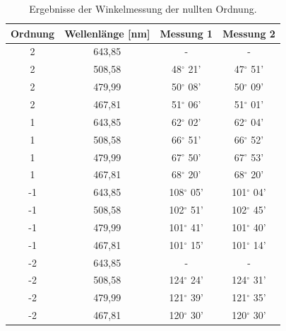 \documentclass[12pt,a4paper]{article}
\begin{document}
	\begin{table}
		\begin{center}
			\begin{tabular}{|c|c|c|c|}
				\hline
				Ordnung & Wellenlänge [nm] & Messung 1 & Messung 2\\
				\hline
				2 & 643,85 & - & -\\
				\hline
				2 & 508,58 & 48$^{\circ}$ 21' & 47$^{\circ}$ 51'\\
				\hline
				2 & 479,99 & 50$^{\circ}$ 08' & 50$^{\circ}$ 09'\\
				\hline
				2 & 467,81 & 51$^{\circ}$ 06' & 51$^{\circ}$ 01'\\
				\hline
				1 & 643,85 & 62$^{\circ}$ 02' & 62$^{\circ}$ 04'\\
				\hline
				1 & 508,58 & 66$^{\circ}$ 51' & 66$^{\circ}$ 52'\\
				\hline
				1 & 479,99 & 67$^{\circ}$ 50' & 67$^{\circ}$ 53'\\
				\hline
				1 & 467,81 & 68$^{\circ}$ 20' & 68$^{\circ}$ 20'\\
				\hline
				-1 & 643,85 & 108$^{\circ}$ 05' & 101$^{\circ}$ 04'\\
				\hline
				-1 & 508,58 & 102$^{\circ}$ 51' & 102$^{\circ}$ 45'\\
				\hline
				-1 & 479,99 & 101$^{\circ}$ 41' & 101$^{\circ}$ 40'\\
				\hline
				-1 & 467,81 & 101$^{\circ}$ 15' & 101$^{\circ}$ 14'\\
				\hline
				-2 & 643,85 & - & -\\
				\hline
				-2 & 508,58 & 124$^{\circ}$ 24' & 124$^{\circ}$ 31'\\
				\hline
				-2 & 479,99 & 121$^{\circ}$ 39' & 121$^{\circ}$ 35'\\
				\hline
				-2 & 467,81 & 120$^{\circ}$ 30' & 120$^{\circ}$ 30'\\
				\hline
			\end{tabular}
			\caption{Ergebnisse der Winkelmessung der nullten Ordnung.}
			\label{tab:RohdatenBestimmungGitterkonstante}
		\end{center}
	\end{table}
	
\end{document}
